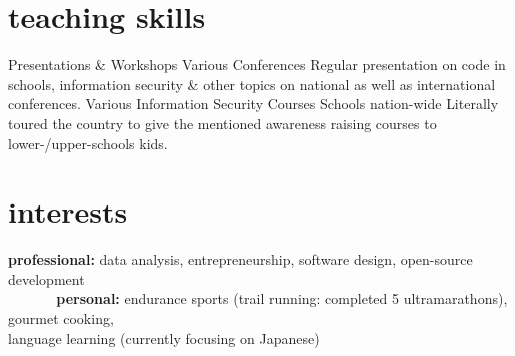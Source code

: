 \documentclass[]{friggeri-cv} %
\begin{document}

\section{teaching skills}

\begin{entrylist}
{Presentations \& Workshops}
{Various Conferences}
{Regular presentation on code in schools, information security \& other topics on national as well as international conferences.}
{Various Information Security Courses}
{Schools nation-wide}
{Literally toured the country to give the mentioned awareness raising courses to lower-/upper-schools kids.}
\end{entrylist}


\section{interests}
\textbf{professional:} data analysis, entrepreneurship, software design, open-source development \\
\textbf{\ \ \ \ \ \ personal:} endurance sports (trail running: completed 5 ultramarathons), gourmet cooking, \\
                               language learning (currently focusing on Japanese)
\end{document}

